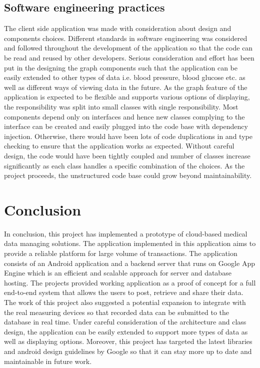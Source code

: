 \subsection{Software engineering practices}
The client side application was made with consideration about design and components choices. Different standards in
software engineering was considered and followed throughout the development of the application so that the code can be
read and reused by other developers. Serious consideration and effort has been put in the designing the graph components
such that the application can be easily extended to other types of data i.e. blood pressure, blood glucose etc. as well
as different ways of viewing data in the future. As the graph feature of the application is expected to be flexible and
supports various options of displaying, the responsibility was split into small classes with single responsibility.
Most components depend only on interfaces and hence new classes complying to the interface can be created and easily
plugged into the code base with dependency injection. Otherwise, there would have been lots of code duplications in and
type checking to ensure that the application works as expected. Without careful design, the code would have been tightly
coupled and number of classes increase significantly as each class handles a specific combination of the choices. As the
project proceeds, the unstructured code base could grow beyond maintainability.

\section{Conclusion}
In conclusion, this project has implemented a prototype of cloud-based medical data managing solutions. The application
implemented in this application aims to provide a reliable platform for large volume of transactions. The application
consists of an Android application and a backend server that runs on Google App Engine which is an efficient and scalable
approach for server and database hosting. The projects provided working application as a proof of concept for a full
end-to-end system that allows the users to post, retrieve and share their data. The work of this project also suggested
a potential expansion to integrate with the real measuring devices so that recorded data can be submitted to the
database in real time. Under careful consideration of the architecture and class design, the application can be easily
extended to support more types of data as well as displaying options. Moreover, this project has targeted the latest
libraries and android design guidelines by Google so that it can stay more up to date and maintainable in future work.
\vfill

 



